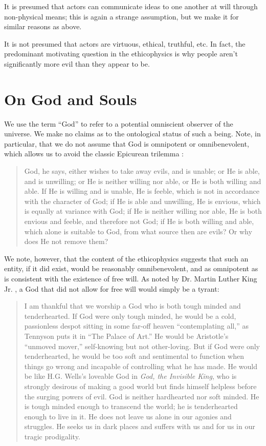 \documentclass{article}
\begin{document}
It is presumed that actors can communicate ideas to one another at
will through non-physical means; this is again a strange assumption,
but we make it for similar reasons as above.

It is not presumed that actors are virtuous, ethical, truthful,
etc. In fact, the predominant motivating question in the ethicophysics
is why people aren't significantly more evil than they appear to be.

\section{On God and Souls}

We use the term ``God'' to refer to a potential omniscient observer of
the universe. We make no claims as to the ontological status of such a
being. Note, in particular, that we do not assume that God is
omnipotent or omnibenevolent, which allows us to avoid the classic
Epicurean trilemma \cite{trilemma}:

\begin{quote}
  God, he says, either wishes to take away evils, and is unable; or He
  is able, and is unwilling; or He is neither willing nor able, or He
  is both willing and able. If He is willing and is unable, He is
  feeble, which is not in accordance with the character of God; if He
  is able and unwilling, He is envious, which is equally at variance
  with God; if He is neither willing nor able, He is both envious and
  feeble, and therefore not God; if He is both willing and able, which
  alone is suitable to God, from what source then are evils? Or why
  does He not remove them?
\end{quote}

We note, however, that the content of the ethicophysics suggests that
such an entity, if it did exist, would be reasonably omnibenevolent,
and as omnipotent as is consistent with the existence of free will.
As noted by Dr. Martin Luther King Jr. \cite{king1963tough}, a God that
did not allow for free will would simply be a tyrant:
\begin{quote}
  I am thankful that we worship a God who is both tough minded and
  tenderhearted. If God were only tough minded, he would be a cold,
  passionless despot sitting in some far-off heaven ``contemplating
  all,'' as Tennyson puts it in ``The Palace of Art.'' He would be
  Aristotle's ``unmoved mover,'' self-knowing but not other-loving.
  But if God were only tenderhearted, he would be too soft and
  sentimental to function when things go wrong and incapable of
  controlling what he has made. He would be like H.G. Wells's loveable
  God in {\em God, the Invisible King}, who is strongly desirous of
  making a good world but finds himself helpless before the surging
  powers of evil. God is neither hardhearted nor soft minded. He is
  tough minded enough to transcend the world; he is tenderhearted
  enough to live in it. He does not leave us alone in our agonies and
  struggles. He seeks us in dark places and suffers with us and for us
  in our tragic prodigality.
\end{quote}
\end{document}
